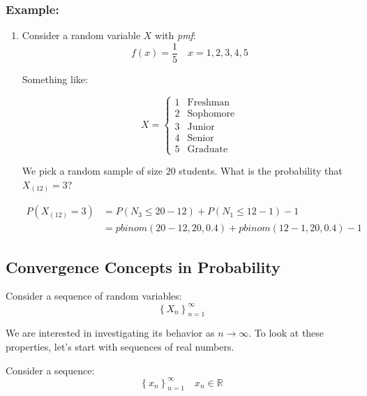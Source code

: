 \documentclass{article}
\newcommand{\ord}[1]{X_{(#1)}}
\begin{document}
\subsubsection*{Example:}
\begin{enumerate}
    \item Consider a random variable $X$ with \textit{pmf}:
    \begin{equation*}
        f(x) = \frac{1}{5} \quad x=1,2,3,4,5
    \end{equation*}
    
    Something like:
    
    \begin{equation*}
        X = \begin{cases}
            1 & \text{Freshman}\\
            2 & \text{Sophomore}\\
            3 & \text{Junior}\\
            4 & \text{Senior}\\
            5 & \text{Graduate}
        \end{cases}
    \end{equation*}
    
    We pick a  random sample of size $20$ students. What is the probability that $\ord{12} = 3$?
    
    \begin{equation*}
    \begin{split}
        P(\ord{12} = 3) &= P(N_3 \leq 20-12) + P(N_1 \leq 12-1) - 1\\
            &= pbinom(20-12,20,0.4) + pbinom(12-1, 20, 0.4) - 1
    \end{split}
    \end{equation*}
\end{enumerate}

\subsection{Convergence Concepts in Probability}

Consider a sequence of random variables:
\begin{equation*}
    \left\{ X_n\right\}_{n=1}^\infty
\end{equation*}

We are interested in investigating its behavior as $n\to\infty$. To look at these properties, let's start with sequences of real numbers. 

Consider a sequence:
\begin{equation*}
    \left\{ x_n\right\}_{n=1}^\infty \quad x_n \in \mathbb{R}
\end{equation*}
\end{document}

